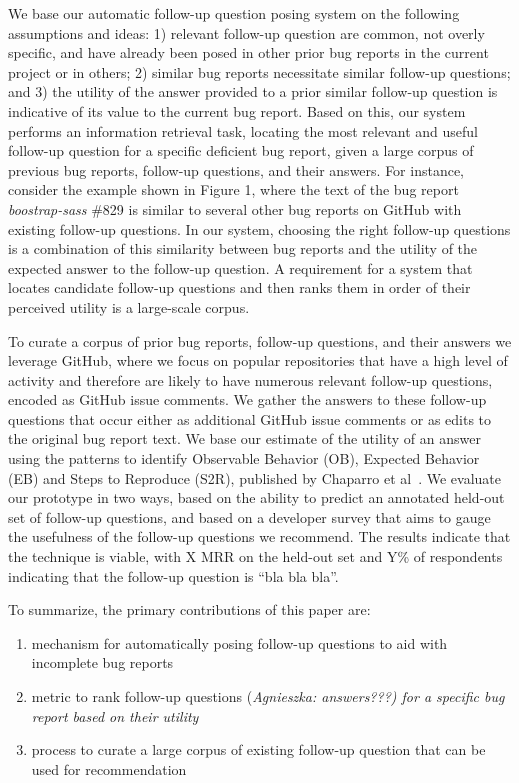 %
We base our automatic follow-up question posing system on the following assumptions and ideas: 1) relevant follow-up question are common, not overly specific, and have already been posed in other prior bug reports in the current project or in others; 2) similar bug reports necessitate similar follow-up questions; and 3) the utility of the answer provided to a prior similar follow-up question is indicative of its value to the current bug report.
%
Based on this, our system performs an information retrieval task, locating the most relevant and useful follow-up question for a specific deficient bug report, given a large corpus of previous bug reports, follow-up questions, and their answers.
%
For instance, consider the example shown in Figure 1, where the text of the bug report {\em boostrap-sass} \#829 is similar to several other bug reports on GitHub with existing follow-up questions.
%
In our system, choosing the right follow-up questions is a combination of this similarity between bug reports and the utility of the expected answer to the follow-up question.
%
A requirement for a system that locates candidate follow-up questions and then ranks them in order of their perceived utility is a large-scale corpus.

To curate a corpus of prior bug reports, follow-up questions, and their answers we leverage GitHub, where we focus on popular repositories that have a high level of activity and therefore are likely to have numerous relevant follow-up questions, encoded as GitHub issue comments. We gather the answers to these follow-up questions that occur either as additional GitHub issue comments or as edits to the original bug report text. We base our estimate of the utility of an answer using the patterns to identify Observable Behavior (OB), Expected Behavior (EB) and Steps to Reproduce (S2R), published by Chaparro et al~\cite{chaparro17detecting}. We evaluate our prototype in two ways, based on the ability to predict an annotated held-out set of follow-up questions, and based on a developer survey that aims to gauge the usefulness of the follow-up questions we recommend. The results indicate that the technique is viable, with X MRR on the held-out set and Y\% of respondents indicating that the follow-up question is “bla bla bla”.

To summarize, the primary contributions of this paper are:
\begin{enumerate}
\item mechanism for automatically posing follow-up questions to aid with incomplete bug reports
\item metric to rank follow-up questions (\em Agnieszka: answers???) for a specific bug report based on their utility
\item process to curate a large corpus of existing follow-up question that can be used for recommendation
\end{enumerate}

